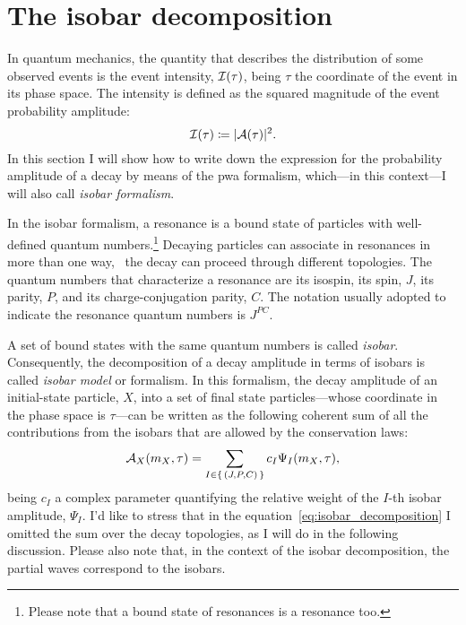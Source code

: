 \section{The isobar decomposition}

    In quantum mechanics, the quantity that describes the distribution of some observed events is the event intensity, $\mathcal{I}(\tau)$, being $\tau$ the coordinate of the event in its phase space.
    The intensity is defined as the squared magnitude of the event probability amplitude:
    \begin{equation}
        \mathcal{I}(\tau) \coloneqq \lvert\mathcal{A}(\tau)\rvert^2.
    \end{equation}
    In this section I will show how to write down the expression for the probability amplitude of a decay by means of the \ac{pwa} formalism, which---in this context---I will also call \emph{isobar formalism}.


    In the isobar formalism, a resonance is a bound state of particles with well-defined quantum numbers.\footnote{Please note that a bound state of resonances is a resonance too.}
    Decaying particles can associate in resonances in more than one way, \ie~the decay can proceed through different topologies.
    The quantum numbers that characterize a resonance are its isospin, its spin, $J$, its parity, $P$, and its charge-conjugation parity, $C$.
    The notation usually adopted to indicate the resonance quantum numbers is $J^{PC}$.


    A set of bound states with the same quantum numbers is called \emph{isobar}.
    Consequently, the decomposition of a decay amplitude in terms of isobars is called \emph{isobar model} or formalism.
    In this formalism, the decay amplitude of an initial-state particle, $X$, into a set of final state particles---whose coordinate in the phase space is $\tau$---can be written as the following coherent sum of all the contributions from the isobars that are allowed by the conservation laws:
    \begin{equation}\label{eq:isobar_decomposition}
        \mathcal{A}_X(m_X,\tau) = \sum_{I\in\set{(J, P, C)}} c_I \Psi_I(m_X, \tau),
    \end{equation}
    being $c_I$ a complex parameter quantifying the relative weight of the $I$-th isobar amplitude, $\Psi_I$.
    I'd like to stress that in the equation~\eqref{eq:isobar_decomposition} I omitted the sum over the decay topologies, as I will do in the following discussion.
    Please also note that, in the context of the isobar decomposition, the partial waves correspond to the isobars.


